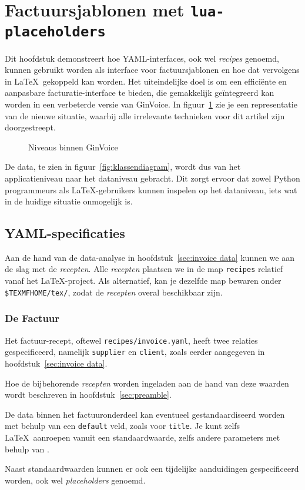 \section{Factuursjablonen met \texttt{lua-placeholders}}\label{sec:new situation}
Dit hoofdstuk demonstreert hoe YAML-interfaces, ook wel \textit{recipes} genoemd, kunnen gebruikt worden als interface voor factuursjablonen en hoe dat vervolgens in \LaTeX\ gekoppeld kan worden.
Het uiteindelijke doel is om een efficiënte en aanpasbare facturatie-interface te bieden, die gemakkelijk geïntegreerd kan worden in een verbeterde versie van GinVoice.
In figuur~\ref{fig:scope-bd} zie je een representatie van de nieuwe situatie, waarbij alle irrelevante technieken voor dit artikel zijn doorgestreept.
\begin{figure}[!ht]
    \centering
    
    \caption{Niveaus binnen GinVoice}\label{fig:scope-bd}
\end{figure}
De data, te zien in figuur~\ref{fig:klassendiagram}, wordt dus van het applicatieniveau naar het dataniveau gebracht.
Dit zorgt ervoor dat zowel Python programmeurs als \LaTeX-gebruikers kunnen inspelen op het dataniveau, iets wat in de huidige situatie onmogelijk is.

\subsection{YAML-specificaties}
Aan de hand van de data-analyse in hoofdstuk~\ref{sec:invoice data} kunnen we aan de slag met de \textit{recepten}.
Alle \textit{recepten} plaatsen we in de map \texttt{recipes} relatief vanaf het \LaTeX-project.
Als alternatief, kan je dezelfde map bewaren onder \texttt{\$TEXMFHOME/tex/}, zodat de \textit{recepten} overal beschikbaar zijn.

\subsubsection{De Factuur}
Het factuur-recept, oftewel \texttt{recipes/invoice.yaml}, heeft twee relaties gespecificeerd, namelijk \texttt{supplier} en \texttt{client}, zoals eerder aangegeven in hoofdstuk~\ref{sec:invoice data}.

Hoe de bijbehorende \textit{recepten} worden ingeladen aan de hand van deze waarden wordt beschreven in hoofdstuk~\ref{sec:preamble}.

De data binnen het factuuronderdeel kan eventueel gestandaardiseerd worden met behulp van een \texttt{default} veld, zoals voor \texttt{title}.
Je kunt zelfs \LaTeX\ aanroepen vanuit een standaardwaarde, zelfs andere parameters met behulp van .

Naast standaardwaarden kunnen er ook een tijdelijke aanduidingen gespecificeerd worden, ook wel \textit{placeholders} genoemd.

